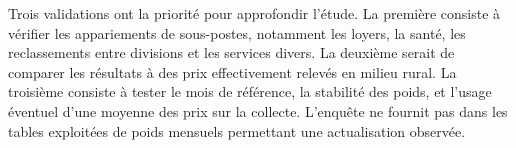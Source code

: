 Trois validations ont la priorité pour approfondir l'étude. La première consiste à vérifier les appariements de sous-postes, notamment les loyers, la santé, les reclassements entre divisions et les services divers. La deuxième serait de comparer les résultats à des prix effectivement relevés en milieu rural. La troisième consiste à tester le mois de référence, la stabilité des poids, et l'usage éventuel d'une moyenne des prix sur la collecte. L'enquête ne fournit pas dans les tables exploitées de poids mensuels permettant une actualisation observée.
